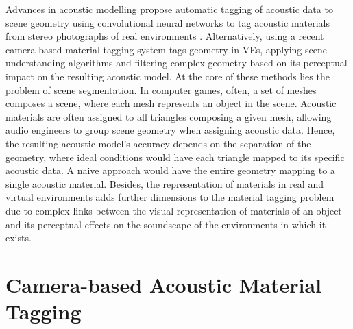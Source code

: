Advances in acoustic modelling propose automatic tagging of acoustic data to scene geometry using convolutional neural networks to tag acoustic materials from stereo photographs of real environments \cite{li2018scene}. Alternatively, using a recent camera-based material tagging system tags geometry in VEs, applying scene understanding algorithms and filtering complex geometry based on its perceptual impact on the resulting acoustic model. At the core of these methods lies the problem of scene segmentation. In computer games, often, a set of meshes composes a scene, where each mesh represents an object in the scene. Acoustic materials are often assigned to all triangles composing a given mesh, allowing audio engineers to group scene geometry when assigning acoustic data. Hence, the resulting acoustic model's accuracy depends on the separation of the geometry, where ideal conditions would have each triangle mapped to its specific acoustic data. A naive approach would have the entire geometry mapping to a single acoustic material. Besides, the representation of materials in real and virtual environments adds further dimensions to the material tagging problem due to complex links between the visual representation of materials of an object and its perceptual effects on the soundscape of the environments in which it exists.\par

\section{Camera-based Acoustic Material Tagging}\label{sec:camera-tagging}
